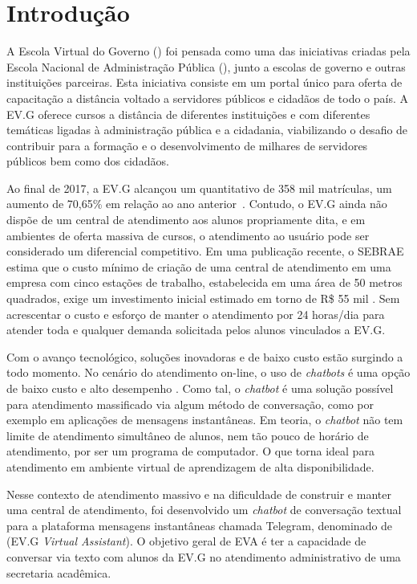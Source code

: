 \chapter{Introdução}\label{cap:01:introducao}

A Escola Virtual do Governo () foi pensada como uma das iniciativas criadas pela Escola Nacional de Administração Pública (), junto a escolas de governo e outras instituições parceiras.
Esta iniciativa consiste em um portal único para oferta de capacitação a distância voltado a servidores públicos e cidadãos de todo o país.
A EV.G oferece cursos a distância de diferentes instituições e com diferentes temáticas ligadas à administração pública e a cidadania, viabilizando o desafio de contribuir para a formação e o desenvolvimento de milhares de servidores públicos bem como dos cidadãos.

Ao final de 2017, a EV.G alcançou um quantitativo de 358 mil matrículas, um aumento de 70,65\% em relação ao ano anterior~\cite{EVGnumeros}.
Contudo, o EV.G ainda não dispõe de um central de atendimento aos alunos propriamente dita, e em ambientes de oferta massiva de cursos, o atendimento ao usuário pode ser considerado um diferencial competitivo.
Em uma publicação recente, o SEBRAE estima que o custo mínimo de criação de uma central de atendimento em uma empresa com cinco estações de trabalho, estabelecida em uma área de 50 metros quadrados, exige um investimento inicial estimado em torno de R\$ 55 mil \cite{SebraeCallCenter}.
Sem acrescentar o custo e esforço de manter o atendimento por 24 horas/dia para atender toda e qualquer demanda solicitada pelos alunos vinculados a EV.G.

Com o avanço tecnológico, soluções inovadoras e de baixo custo estão surgindo a todo momento.
No cenário do atendimento on-line, o uso de \textit{chatbots} é uma opção de baixo custo e alto desempenho \cite{CallCenterInf}.
Como tal, o \textit{chatbot} é uma solução possível para atendimento massificado via algum método de conversação, como por exemplo em aplicações de mensagens instantâneas.
Em teoria, o \textit{chatbot} não tem limite de atendimento simultâneo de alunos, nem tão pouco de horário de atendimento, por ser um programa de computador.
O que torna ideal para atendimento em ambiente virtual de aprendizagem de alta disponibilidade.

Nesse contexto de atendimento massivo e na dificuldade de construir e manter uma central de atendimento, foi desenvolvido um \textit{chatbot} de conversação textual para a plataforma mensagens instantâneas chamada  Telegram, denominado de  (EV.G \textit{Virtual Assistant}).
O objetivo geral de EVA é ter a capacidade de conversar via texto com alunos da EV.G no atendimento administrativo de uma secretaria acadêmica.


